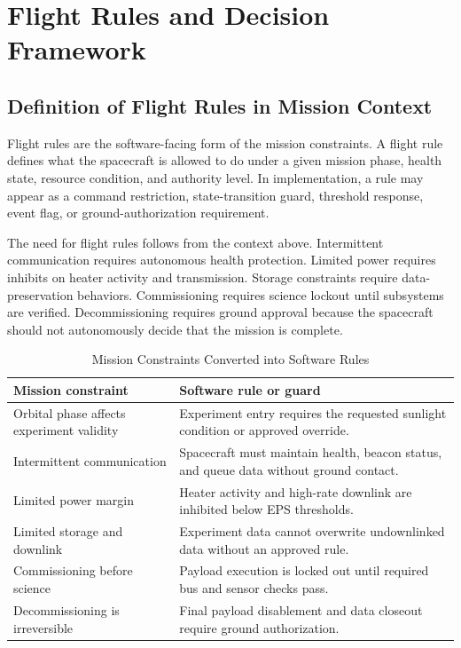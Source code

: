 \documentclass[10pt,letterpaper,twoside,fleqn]{article}
\newcommand{\Indent}{\hspace*{4\fontdimen2\font}}
\begin{document}
\section{Flight Rules and Decision Framework}

\subsection{Definition of Flight Rules in Mission Context}

\Indent
Flight rules are the software-facing form of the mission constraints. A flight rule defines what the spacecraft is allowed to do under a given mission phase, health state, resource condition, and authority level. In implementation, a rule may appear as a command restriction, state-transition guard, threshold response, event flag, or ground-authorization requirement.

The need for flight rules follows from the context above. Intermittent communication requires autonomous health protection. Limited power requires inhibits on heater activity and transmission. Storage constraints require data-preservation behaviors. Commissioning requires science lockout until subsystems are verified. Decommissioning requires ground approval because the spacecraft should not autonomously decide that the mission is complete.

\begin{table}[H]
\centering
\caption{Mission Constraints Converted into Software Rules}
\label{tab:constraint-rules}
\small
\begin{tabularx}{\columnwidth}{>{\raggedright\arraybackslash}p{}X}
\toprule
Mission constraint & Software rule or guard \\
\midrule
Orbital phase affects experiment validity & Experiment entry requires the requested sunlight condition or approved override. \\
Intermittent communication & Spacecraft must maintain health, beacon status, and queue data without ground contact. \\
Limited power margin & Heater activity and high-rate downlink are inhibited below EPS thresholds. \\
Limited storage and downlink & Experiment data cannot overwrite undownlinked data without an approved rule. \\
Commissioning before science & Payload execution is locked out until required bus and sensor checks pass. \\
Decommissioning is irreversible & Final payload disablement and data closeout require ground authorization. \\
\bottomrule
\end{tabularx}
\end{table}
\end{document}
